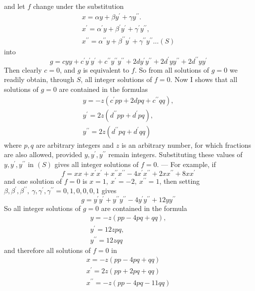 and let \(f\) change under the substitution
\[\begin{gathered}x=\alpha y+\beta y^\prime+\gamma y^{\prime\prime}.\\ x^\prime=\alpha^\prime y+\beta^\prime y^\prime+\gamma^\prime y^{\prime\prime},\\ x^{\prime\prime}=\alpha^{\prime\prime}y+\beta^{\prime\prime}y^\prime+\gamma^{\prime\prime}y^{\prime\prime}\ldots(S)\end{gathered}\]
into
\[g=cyy+c^\prime y^\prime y^\prime+c^{\prime\prime}y^{\prime\prime}y^{\prime\prime}+2dy^\prime y^{\prime\prime}+2d^\prime yy^{\prime\prime}+2d^{\prime\prime}yy^\prime\]
Then clearly \(c=0\), and \(g\) is equivalent to \(f\). So from all solutions of \(g=0\) we readily obtain, through \(S\), all integer solutions of \(f=0\). Now I shows that all solutions of \(g=0\) are contained in the formulas
\[\begin{gathered}y=-z(c^\prime pp+2dpq+c^{\prime\prime}qq),\\ y^\prime=2z(d^{\prime\prime}pp+d^\prime pq),\\ y^{\prime\prime}=2z(d^{\prime\prime}pq+d^\prime qq)\end{gathered}\]
where \(p,q\) are arbitrary integers and \(z\) is an arbitrary number, for which fractions are also allowed, provided \(y,y^\prime,y^{\prime\prime}\) remain integers. Substituting these values of \(y,y^\prime,y^{\prime\prime}\) in \((S)\) gives all integer solutions of \(f=0\). — For example, if
\[f=xx+x^\prime x^\prime+x^{\prime\prime}x^{\prime\prime}-4x^\prime x^{\prime\prime}+2xx^{\prime\prime}+8xx^\prime\]
and one solution of \(f=0\) is \(x=1,\ x^\prime=-2,\ x^{\prime\prime}=1\), then setting \(\beta,\beta^\prime,\beta^{\prime\prime},\ \gamma,\gamma^\prime,\gamma^{\prime\prime}=0,1,0,0,0,1\) gives
\[g=y^\prime y^\prime+y^{\prime\prime}y^{\prime\prime}-4y^\prime y^{\prime\prime}+12yy^{\prime\prime}\]
So all integer solutions of \(g=0\) are contained in the formula
\[\begin{gathered}y=-z(pp-4pq+qq),\\ y^\prime=12zpq,\\ y^{\prime\prime}=12zqq\end{gathered}\]
and therefore all solutions of \(f=0\) in
\[\begin{gathered}x=-z(pp-4pq+qq)\\x^\prime=2z(pp+2pq+qq)\\x^{\prime\prime}=-z(pp-4pq-11qq)\end{gathered}\]


